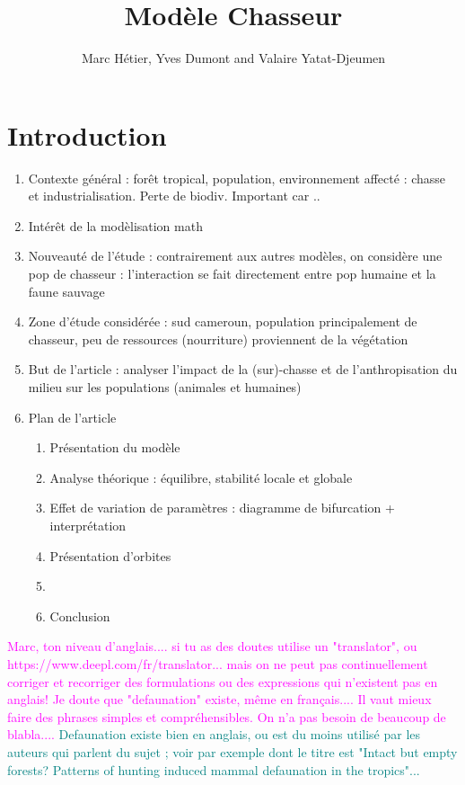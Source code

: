 \documentclass{article}
\title{Modèle Chasseur}
\author{Marc Hétier, Yves Dumont  and Valaire Yatat-Djeumen}
\newcommand{\marc}[1]{\textcolor{teal}{#1}}
\newcommand{\YD}[1]{\textcolor{magenta}{#1}}
\begin{document}
\maketitle

\section{Introduction}

\begin{enumerate}
\item Contexte général : forêt tropical, population, environnement affecté : chasse et industrialisation. Perte de biodiv. Important car ..
\item  Intérêt de la modèlisation math
\item Nouveauté de l'étude : contrairement aux autres modèles, on considère une pop de chasseur : l'interaction se fait directement entre pop humaine et la faune sauvage
\item Zone d'étude considérée : sud cameroun, population principalement de chasseur, peu de ressources (nourriture) proviennent de la végétation
\item But de l'article : analyser l'impact de la (sur)-chasse et de l'anthropisation du milieu sur les populations (animales et humaines)
\item Plan de l'article

\begin{enumerate}
\item Présentation du modèle
\item Analyse théorique : équilibre, stabilité locale et globale
\item Effet de variation de paramètres : diagramme de bifurcation + interprétation
\item Présentation d'orbites
\item 
\item Conclusion
\end{enumerate}
\end{enumerate}
\YD{Marc, ton niveau d'anglais.... si tu as des doutes utilise un "translator", ou https://www.deepl.com/fr/translator... mais on ne peut pas continuellement corriger et recorriger des formulations ou des expressions qui n'existent pas en anglais! Je doute que "defaunation" existe, même en français.... Il vaut mieux faire des phrases simples et compréhensibles. On n'a pas besoin de beaucoup de blabla....} \marc{Defaunation existe bien en anglais, ou est du moins utilisé par les auteurs qui parlent du sujet ; voir par exemple \cite{benitez-lopez_intact_2019} dont le titre est "Intact but empty forests? Patterns of hunting induced mammal defaunation in the tropics"...} 
\end{document}

